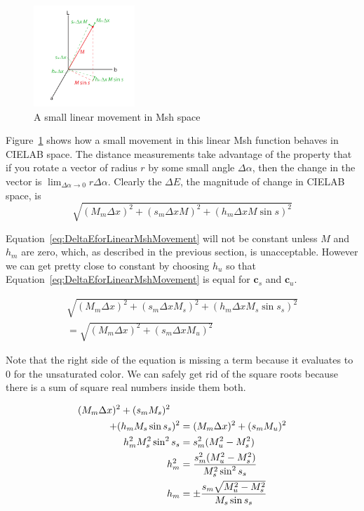 \documentclass{vgtc}                          %
\newcommand{\Lab}{CIELAB\xspace}
\newcommand{\Msh}{Msh\xspace}
\newcommand{\DeltaE}{\ensuremath{\Delta{}E}\xspace}
\newcommand*{\cvec}[1]{\mathbf{#1}}
\begin{document}
\begin{figure}
  \centering
  \includegraphics[height=1.5in]{images/MshDeltaMovements}
  \caption{A small linear movement in \Msh space}
  \label{sec:LinearMshMovement}
\end{figure}

Figure~\ref{sec:LinearMshMovement} shows how a small movement in this
linear \Msh function behaves in \Lab space.  The distance measurements take
advantage of the property that if you rotate a vector of radius $r$ by some
small angle $\Delta\alpha$, then the change in the vector is
$\lim_{\Delta\alpha \rightarrow 0}r \Delta\alpha$.  Clearly the \DeltaE,
the magnitude of change in \Lab space, is
\begin{equation}
  \sqrt{(M_m \Delta x)^2 + (s_m \Delta x M)^2 + (h_m \Delta x M \sin s)^2}
  \label{eq:DeltaEforLinearMshMovement}
\end{equation}

Equation~\ref{eq:DeltaEforLinearMshMovement} will not be constant unless
$M$ and $h_m$ are zero, which, as described in the previous section, is
unacceptable.  However we can get pretty close to constant by choosing
$h_u$ so that Equation~\ref{eq:DeltaEforLinearMshMovement} is equal for
$\cvec{c}_s$ and $\cvec{c}_u$.

\begin{multline*}
  \sqrt{(M_m \Delta x)^2 + (s_m \Delta x M_s)^2 + (h_m \Delta x M_s \sin s_s)^2}
  \\ =
  \sqrt{(M_m \Delta x)^2 + (s_m \Delta x M_u)^2}
\end{multline*}

Note that the right side of the equation is missing a term because it
evaluates to 0 for the unsaturated color.  We can safely get rid of the
square roots because there is a sum of square real numbers inside them
both.

\begin{align}
    (M_m \Delta x)^2 + (s_m M_s)^2 \quad & \notag \\
    + (h_m M_s \sin s_s)^2 &= (M_m \Delta x)^2 + (s_m M_u)^2 \notag \\
    h_m^2 M_s^2 \sin^2 s_s &= s_m^2 (M_u^2 - M_s^2) \notag \\
    h_m^2 &= \frac{s_m^2 (M_u^2 - M_s^2)}{M_s^2 \sin^2 s_s} \notag \\
    h_m &= \pm \frac{s_m \sqrt{M_u^2 - M_s^2}}{M_s \sin s_s}
    \label{eqn:adjusted_hm}
\end{align}
\end{document}
